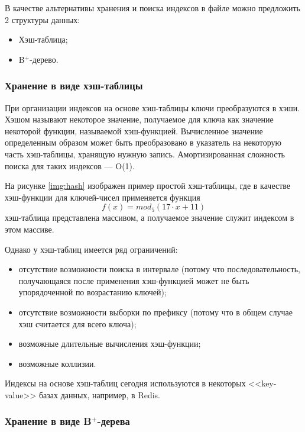 В качестве альтернативы хранения и поиска индексов в файле можно предложить 2 структуры данных:
\begin{itemize}
    \item Хэш-таблица;
    \item B$^+$-дерево.
\end{itemize}

\subsubsection{Хранение в виде хэш-таблицы}

При организации индексов на основе хэш-таблицы ключи преобразуются в хэши\cite{hash}. Хэшом называют некоторое значение, получаемое для ключа как значение некоторой функции, называемой хэш-функцией. Вычисленное значение определенным образом может быть преобразовано в указатель на некоторую часть хэш-таблицы, хранящую нужную запись. Амортизированная сложность\cite{compl} поиска для таких индексов --- O(1).

На рисунке \ref{img:hash} изображен пример простой хэш-таблицы, где в качестве хэш-функции для ключей-чисел применяется функция $$f(x) = mod_5(17 \cdot x + 11)$$ хэш-таблица представлена массивом, а получаемое значение служит индексом в этом массиве.

\clearpage
{}

Однако у хэш-таблиц имеется ряд ограничений:
\begin{itemize}
    \item отсутствие возможности поиска в интервале (потому что последовательность, получающаяся после применения хэш-функцией может не быть упорядоченной по возрастанию ключей);
    \item отсутствие возможности выборки по префиксу (потому что в общем случае хэш считается для всего ключа);
    \item возможные длительные вычисления хэш-функции;
    \item возможные коллизии\cite{hash}.
\end{itemize}

Индексы на основе хэш-таблиц сегодня используются в некоторых <<key-value>> базах данных, например, в Redis\cite{redis}.

\subsubsection{Хранение в виде B$^+$-дерева}

